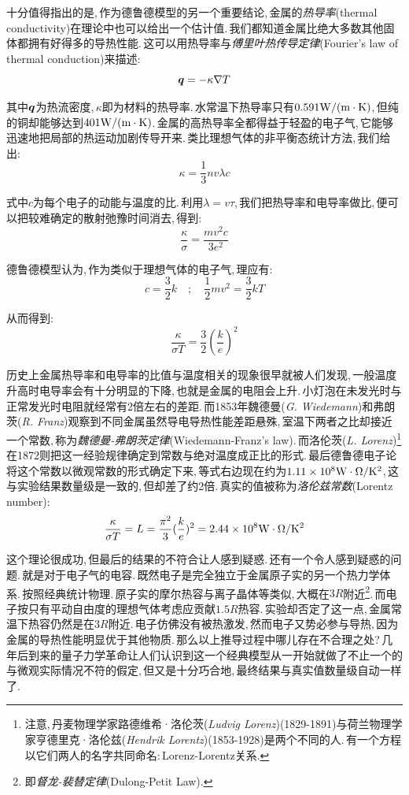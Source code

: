 十分值得指出的是,\,作为德鲁德模型的另一个重要结论,\,金属的\emph{热导率}(thermal conductivity)在理论中也可以给出一个估计值.\,我们都知道金属比绝大多数其他固体都拥有好得多的导热性能.\,这可以用热导率与\emph{傅里叶热传导定律}(Fourier's law of thermal conduction)来描述:
\[\boldsymbol{q}=-\kappa \nabla T\]

其中$\boldsymbol{q}$为热流密度,\,$\kappa$即为材料的热导率.\,水常温下热导率只有$0.591 \rm W/(m\cdot K)$,\,但纯的铜却能够达到$401 \rm W/(m\cdot K)$.\,金属的高热导率全都得益于轻盈的电子气,\,它能够迅速地把局部的热运动加剧传导开来.\,类比理想气体的非平衡态统计方法,\,我们给出:
\[\kappa=\frac{1}{3}nv\lambda c\]

式中$c$为每个电子的动能与温度的比.\,利用$\lambda=v\tau$,\,我们把热导率和电导率做比,\,便可以把较难确定的散射弛豫时间消去,\,得到:
\[\frac{\kappa}{\sigma}=\frac{mv^2c}{3e^2}\]

德鲁德模型认为,\,作为类似于理想气体的电子气,\,理应有:
\[c=\frac{3}{2}k\quad ;\quad \frac{1}{2}mv^2=\frac{3}{2}kT \]

从而得到:
\[\frac{\kappa}{\sigma T}=\frac{3}{2}(\frac{k}{e})^2\]

历史上金属热导率和电导率的比值与温度相关的现象很早就被人们发现,\,一般温度升高时电导率会有十分明显的下降,\,也就是金属的电阻会上升.\,小灯泡在未发光时与正常发光时电阻就经常有2倍左右的差距.\,而1853年魏德曼({\it G. Wiedemann})和弗朗茨({\it R. Franz})观察到不同金属虽然导电导热性能差距悬殊,\,室温下两者之比却接近一个常数,\,称为\emph{魏德曼-弗朗茨定律}(Wiedemann-Franz's law).\,而洛伦茨({\it L. Lorenz})\footnote{注意,\,丹麦物理学家路德维希·洛伦茨({\it Ludvig Lorenz})(1829-1891)与荷兰物理学家亨德里克·洛伦兹({\it Hendrik Lorentz})(1853-1928)是两个不同的人.\,有一个方程以它们两人的名字共同命名:\,Lorenz-Lorentz关系.}在1872则把这一经验规律确定到常数与绝对温度成正比的形式.\,最后德鲁德电子论将这个常数以微观常数的形式确定下来,\,等式右边现在约为$1.11\times 10^{8} \rm W \cdot\Omega /K^2$,\,这与实验结果数量级是一致的,\,但却差了约2倍.\,真实的值被称为\emph{洛伦兹常数}(Lorentz number):
\[\frac{\kappa}{\sigma T}=L=\frac{\pi^2}{3}(\frac{k}{e})^2=2.44\times 10^{8} \rm W \cdot\Omega /K^2\]

这个理论很成功,\,但最后的结果的不符合让人感到疑惑.\,还有一个令人感到疑惑的问题.\,就是对于电子气的电容.\,既然电子是完全独立于金属原子实的另一个热力学体系.\,按照经典统计物理.\,原子实的摩尔热容与离子晶体等类似,\,大概在$3R$附近\footnote{即\emph{督龙-裴替定律}(Dulong-Petit Law).}.\,而电子按只有平动自由度的理想气体考虑应贡献$1.5R$热容.\,实验却否定了这一点,\,金属常温下热容仍然是在$3R$附近.\,电子仿佛没有被热激发,\,然而电子又势必参与导热,\,因为金属的导热性能明显优于其他物质.\,那么以上推导过程中哪儿存在不合理之处?\,几年后到来的量子力学革命让人们认识到这一个经典模型从一开始就做了不止一个的与微观实际情况不符的假定,\,但又是十分巧合地,\,最终结果与真实值数量级自动一样了.

